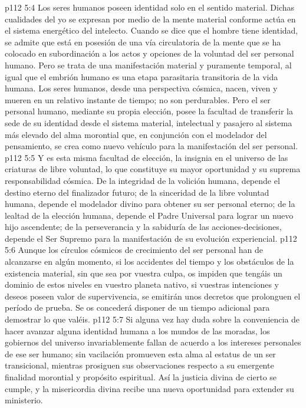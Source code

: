 \vs p112 5:4 Los seres humanos poseen identidad solo en el sentido material. Dichas cualidades del yo se expresan por medio de la mente material conforme actúa en el sistema energético del intelecto. Cuando se dice que el hombre tiene identidad, se admite que está en posesión de una vía circulatoria de la mente que se ha colocado en subordinación a los actos y opciones de la voluntad del ser personal humano. Pero se trata de una manifestación material y puramente temporal, al igual que el embrión humano es una etapa parasitaria transitoria de la vida humana. Los seres humanos, desde una perspectiva cósmica, nacen, viven y mueren en un relativo instante de tiempo; no son perdurables. Pero el ser personal humano, mediante su propia elección, posee la facultad de transferir la sede de su identidad desde el sistema material, intelectual y pasajero al sistema más elevado del alma morontial que, en conjunción con el modelador del pensamiento, se crea como nuevo vehículo para la manifestación del ser personal.
\vs p112 5:5 Y es esta misma facultad de elección, la insignia en el universo de las criaturas de libre voluntad, lo que constituye su mayor oportunidad y su suprema responsabilidad cósmica. De la integridad de la volición humana, depende el destino eterno del finalizador futuro; de la sinceridad de la libre voluntad humana, depende el modelador divino para obtener su ser personal eterno; de la lealtad de la elección humana, depende el Padre Universal para lograr un nuevo hijo ascendente; de la perseverancia y la sabiduría de las acciones\hyp{}decisiones, depende el Ser Supremo para la manifestación de su evolución experiencial.
\vs p112 5:6 \pc Aunque los círculos cósmicos de crecimiento del ser personal han de alcanzarse en algún momento, si los accidentes del tiempo y los obstáculos de la existencia material, sin que sea por vuestra culpa, os impiden que tengáis un dominio de estos niveles en vuestro planeta nativo, si vuestras intenciones y deseos poseen valor de supervivencia, se emitirán unos decretos que prolonguen el período de prueba. Se os concederá disponer de un tiempo adicional para demostrar lo que valéis.
\vs p112 5:7 Si alguna vez hay duda sobre la conveniencia de hacer avanzar alguna identidad humana a los mundos de las moradas, los gobiernos del universo invariablemente fallan de acuerdo a los intereses personales de ese ser humano; sin vacilación promueven esta alma al estatus de un ser transicional, mientras prosiguen sus observaciones respecto a su emergente finalidad morontial y propósito espiritual. Así la justicia divina de cierto se cumple, y la misericordia divina recibe una nueva oportunidad para extender su ministerio.
